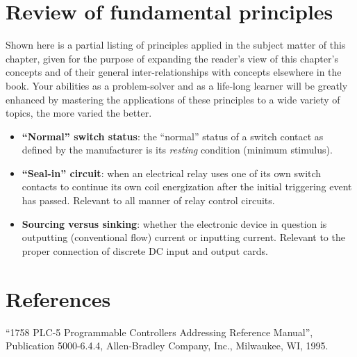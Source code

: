 \filbreak
\section{Review of fundamental principles}

Shown here is a partial listing of principles applied in the subject matter of this chapter, given for the purpose of expanding the reader's view of this chapter's concepts and of their general inter-relationships with concepts elsewhere in the book.  Your abilities as a problem-solver and as a life-long learner will be greatly enhanced by mastering the applications of these principles to a wide variety of topics, the more varied the better.

\begin{itemize}
\item \textbf{``Normal'' switch status}: the ``normal'' status of a switch contact as defined by the manufacturer is its \textit{resting} condition (minimum stimulus).
\item \textbf{``Seal-in'' circuit}: when an electrical relay uses one of its own switch contacts to continue its own coil energization after the initial triggering event has passed.  Relevant to all manner of relay control circuits.
\item \textbf{Sourcing versus sinking}: whether the electronic device in question is outputting (conventional flow) current or inputting current.  Relevant to the proper connection of discrete DC input and output cards.
\end{itemize}













\filbreak
\section*{References}


\noindent
``1758 PLC-5 Programmable Controllers Addressing Reference Manual'', Publication 5000-6.4.4, Allen-Bradley Company, Inc., Milwaukee, WI, 1995.

\vskip 10pt

